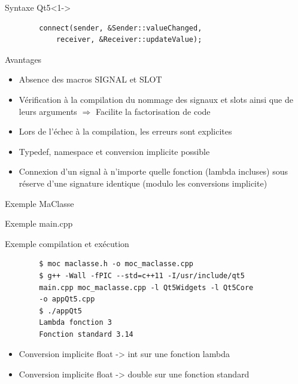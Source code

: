 \documentclass{beamer} %
\begin{document}
\begin{frame}[fragile]
	\begin{exampleblock}{Syntaxe Qt5}<1->
		\begin{lstlisting}
		connect(sender, &Sender::valueChanged,
			receiver, &Receiver::updateValue);
		\end{lstlisting}
	\end{exampleblock}
	\begin{block}{Avantages}
		\begin{itemize}
			\item<2-> Absence des macros SIGNAL et SLOT
			\item<3-> Vérification à la compilation du nommage des signaux et slots ainsi que de leurs arguments $ \Rightarrow $ Facilite la factorisation de code
			\item<4-> Lors de l'échec à la compilation, les erreurs sont explicites
			\item<5-> Typedef, namespace et conversion implicite possible
			\item<6-> Connexion d'un signal à n'importe quelle fonction (lambda incluses)  sous réserve d'une signature identique (modulo les conversions implicite)
		\end{itemize}
	\end{block}
\end{frame}

\begin{frame}
	\begin{exampleblock}{Exemple MaClasse}
		
	\end{exampleblock}
\end{frame}

\begin{frame}
	\begin{exampleblock}{Exemple main.cpp}
		
	\end{exampleblock}
\end{frame}

\begin{frame}[fragile]
	\begin{exampleblock}{Exemple compilation et exécution}
		\begin{verbatim}
		$ moc maclasse.h -o moc_maclasse.cpp
		$ g++ -Wall -fPIC --std=c++11 -I/usr/include/qt5 
		main.cpp moc_maclasse.cpp -l Qt5Widgets -l Qt5Core 
		-o appQt5.cpp
		$ ./appQt5
		Lambda fonction 3
		Fonction standard 3.14
		\end{verbatim}
		\begin{itemize}
			\item<2-> Conversion implicite float -> int sur une fonction lambda
			\item<3-> Conversion implicite float -> double sur une fonction standard
		\end{itemize}
	\end{exampleblock}
\end{frame}
\end{document}
